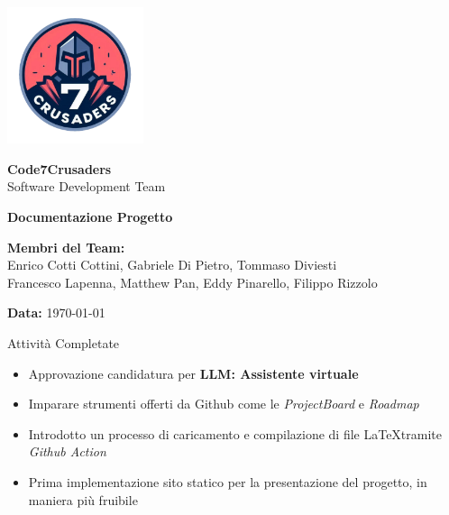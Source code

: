 \documentclass{beamer}
\begin{document}
\begin{frame}[plain] %
    \centering
    \vspace*{2cm}
    
    \includegraphics[width=0.3\textwidth]{../img/logo/7Crusaders_logo.png} %
    \vspace{1cm}
    
    {\Huge \textbf{Code7Crusaders}}\\
    \vspace{0.5cm}
    {\Large Software Development Team}\\
    \vspace{2cm}
    
    {\large \textbf{Documentazione Progetto}}\\
    \vspace{3cm}

    \textbf{Membri del Team:}\\
    Enrico Cotti Cottini, Gabriele Di Pietro, Tommaso Diviesti \\
    Francesco Lapenna, Matthew Pan, Eddy Pinarello, Filippo Rizzolo \\
    \vspace{1cm}
    
    {\large \textbf{Data:}} \today\\
    
    \vspace{1cm}
\end{frame}

\begin{frame}
    \begin{exampleblock}{Attività Completate}
        \begin{itemize}
            \item Approvazione candidatura per \textbf{LLM: Assistente virtuale}
            \item Imparare strumenti offerti da Github come le \emph{ProjectBoard} e \emph{Roadmap}
            \item Introdotto un processo di caricamento e compilazione di file \LaTeX tramite \emph{Github Action}
            \item Prima implementazione sito statico per la presentazione del progetto, in maniera più fruibile
        \end{itemize}
    \end{exampleblock}
\end{frame}
\end{document}
